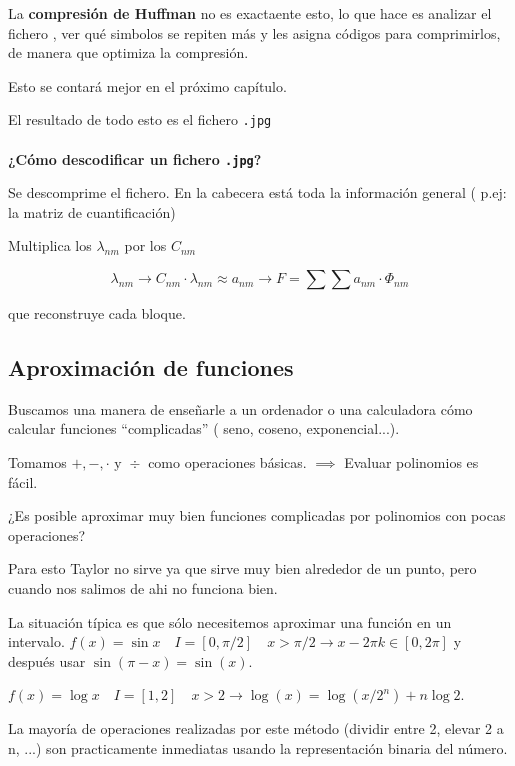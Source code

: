 			La \textbf{compresión de Huffman} no es exactaente esto, lo que hace es analizar el fichero , ver qué simbolos se repiten más y les asigna códigos para comprimirlos, de manera que optimiza la compresión.

			Esto se contará mejor en el próximo capítulo.


			El resultado de todo esto es el fichero \texttt{.jpg}\\\\


			\textbf{¿Cómo descodificar un  fichero \texttt{.jpg}?}

			Se descomprime el fichero. En la cabecera está toda la información general ( p.ej: la matriz de cuantificación)

			Multiplica los $\lambda_{nm}$ por los $C_{nm}$

			$$\lambda_{nm} \rightarrow C_{nm}\cdot \lambda_{nm} \approx a_{nm} \rightarrow F = \sum \sum a_{nm} \cdot \Phi_{nm}$$

			que reconstruye cada bloque.

	\subsection{Aproximación de funciones}

		Buscamos una manera de enseñarle a un ordenador o una calculadora cómo calcular funciones ``complicadas'' ( seno, coseno, exponencial...).


		Tomamos $ +,-, \cdot \text{ y } \div$ como operaciones básicas. $\implies$ Evaluar polinomios es fácil.

		¿Es posible aproximar muy bien funciones complicadas por polinomios con pocas operaciones?


		Para esto Taylor no sirve ya que sirve muy bien alrededor de un punto, pero cuando nos salimos de ahi no funciona bien.




		La situación típica es que sólo necesitemos aproximar una función en un intervalo.
		$f(x) = \sin x \quad I= [0, \pi/2] \quad x > \pi/2 \rightarrow x - 2\pi k \in [0, 2\pi]$ y después usar $\sin (\pi - x) = \sin (x)$.

		$f(x) = \log x \quad I= [1, 2] \quad x > 2 \rightarrow \log (x) = \log(x / 2^n) + n \log 2$.

		La mayoría de operaciones realizadas por este método (dividir entre 2, elevar 2 a n, ...) son practicamente inmediatas usando la representación binaria del número.



